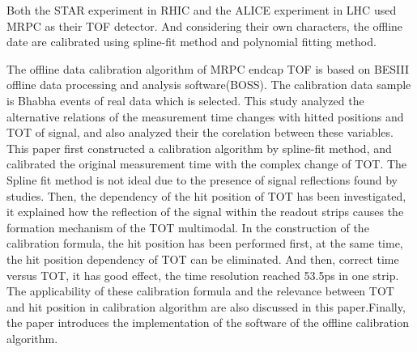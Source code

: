 \begin{englishabstract}
Both the STAR experiment in RHIC and the ALICE experiment in LHC used MRPC as their TOF detector. And considering their own characters, the offline date are calibrated using spline-fit method and polynomial fitting method.

The offline data calibration algorithm of MRPC endcap TOF is based on BESIII offline data processing and analysis software(BOSS). The calibration data sample is Bhabha events of real data which is selected.
This study analyzed the alternative relations of the measurement time changes with hitted positions and TOT of signal, and also  analyzed their the corelation between these variables. This paper first constructed a calibration algorithm by spline-fit method, and calibrated the original measurement time with the complex change of TOT. The Spline fit method is not ideal due to the presence of signal reflections found by studies. Then, the dependency of the hit position of TOT has been investigated, it explained how the reflection of the signal within the readout strips causes the formation mechanism of the TOT multimodal. In the construction of the calibration formula, the hit position has been performed first, at the same time, the hit position dependency of TOT can be eliminated. And then, correct time versus TOT, it has good effect, the time resolution reached 53.5ps in one strip. The applicability of these calibration formula and the relevance between TOT and hit position in calibration algorithm are also discussed in this paper.Finally, the paper introduces the implementation of the software of the offline calibration algorithm.    


\end{englishabstract}
